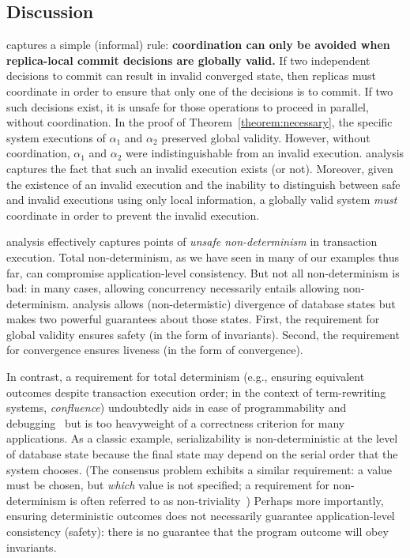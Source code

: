 \subsection{Discussion}

\iconfluence captures a simple (informal) rule: \textbf{coordination
  can only be avoided when replica-local commit decisions are globally
  valid.} If two independent decisions to commit can result in invalid
converged state, then replicas must coordinate in order to ensure that
only one of the decisions is to commit. If two such decisions exist,
it is unsafe for those operations to proceed in parallel, without
coordination. In the proof of Theorem~\ref{theorem:necessary}, the
specific system executions of $\alpha_1$ and $\alpha_2$ preserved
global validity. However, without coordination, $\alpha_1$ and
$\alpha_2$ were indistinguishable from an invalid
execution. \iconfluence analysis captures the fact that such an
invalid execution exists (or not). Moreover, given the existence of an
invalid execution and the inability to distinguish between safe and
invalid executions using only local information, a globally valid
system \textit{must} coordinate in order to prevent the invalid
execution.

\iconfluence analysis effectively captures points of \textit{unsafe
  non-determinism} in transaction execution. Total non-determinism, as
we have seen in many of our examples thus far, can compromise
application-level consistency. But not all non-determinism is bad: in
many cases, allowing concurrency necessarily entails allowing
non-determinism. \iconfluence analysis allows (non-determistic)
divergence of database states but makes two powerful guarantees about
those states. First, the requirement for global validity ensures
safety (in the form of invariants). Second, the requirement for
convergence ensures liveness (in the form of
convergence). 

In contrast, a requirement for total determinism (e.g., ensuring
equivalent outcomes despite transaction execution order; in the
context of term-rewriting systems, \textit{confluence}) undoubtedly
aids in ease of programmability and
debugging~\cite{blooml,calm,termrewriting} but is too heavyweight of a
correctness criterion for many applications. As a classic example,
serializability is non-deterministic at the level of database state
because the final state may depend on the serial order that the system
chooses. (The consensus problem exhibits a similar requirement: a
value must be chosen, but \textit{which} value is not specified; a
requirement for non-determinism is often referred to as
non-triviality~\cite{paxos-commit}) Perhaps more importantly, ensuring
deterministic outcomes does not necessarily guarantee
application-level consistency (safety): there is no guarantee that the
program outcome will obey invariants.

